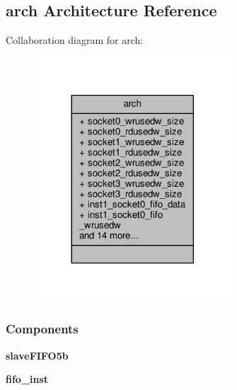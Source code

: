 \subsection{arch Architecture Reference}
\label{classFX3__slaveFIFO5b__top_1_1arch}


Collaboration diagram for arch\+:\nopagebreak
\begin{figure}[H]
\begin{center}
\leavevmode
\includegraphics[width=209pt]{d9/d05/classFX3__slaveFIFO5b__top_1_1arch__coll__graph}
\end{center}
\end{figure}
\subsubsection*{Components}
 \begin{DoxyCompactItemize}
\item 
{\bf slave\+F\+I\+F\+O5b}  {\bfseries }  
\item 
{\bf fifo\+\_\+inst}  {\bfseries }  
\end{DoxyCompactItemize}
